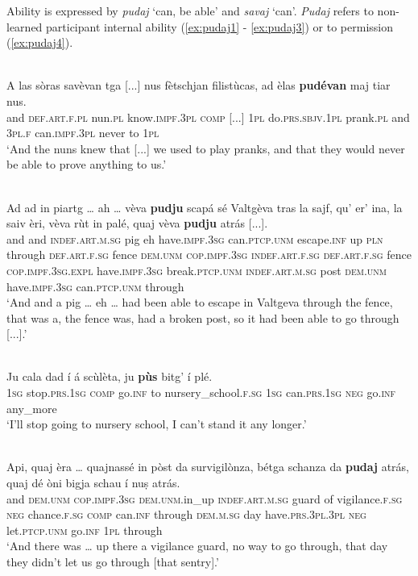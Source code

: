 Ability is expressed by \textit{pudaj} `can, be able' and \textit{savaj} `can'. \textit{Pudaj} refers to non-learned participant internal ability (\ref{ex:pudaj1} - \ref{ex:pudaj3}) or to permission (\ref{ex:pudaj4}).

\ea
\label{ex:pudaj1}
\\
\gll    A las sòras savèvan tga [...] nus fètschjan filistùcas, ad èlas \textbf{pudévan} maj tiar nus.\\
and \textsc{def.art.f.pl} nun.\textsc{pl} know.\textsc{impf.3pl} \textsc{comp} [...] \textsc{1pl} do.\textsc{prs.sbjv.1pl} prank.\textsc{pl} and \textsc{3pl.f} can.\textsc{impf.3pl} never to \textsc{1pl}\\
\glt `And the nuns knew that [...] we used to play pranks, and that they would never be able to prove anything to us.'
\z

\ea
\label{ex:pudaj2}
\\
\gll    Ad ad in piartg … ah … vèva \textbf{pudju} scapá sé Valtgèva tras la sajf, qu’ er’ ina, la saiv èri, vèva rùt in palé, quaj vèva \textbf{pudju} atrás [...].\\
and and \textsc{indef.art.m.sg} pig {} eh {}  have.\textsc{impf.3sg} can.\textsc{ptcp.unm} escape.\textsc{inf} up \textsc{pln} through \textsc{def.art.f.sg} fence  \textsc{dem.unm} \textsc{cop.impf.3sg}  \textsc{indef.art.f.sg} \textsc{def.art.f.sg} fence \textsc{cop.impf.3sg.expl} have.\textsc{impf.3sg} break.\textsc{ptcp.unm}  \textsc{indef.art.m.sg} post \textsc{dem.unm}  have.\textsc{impf.3sg} can.\textsc{ptcp.unm} through \\
\glt `And and a pig … eh … had been able to escape in Valtgeva through the fence, that was a, the fence was, had a broken post, so it had been able to go through [...].'
\z

\ea
\label{ex:pudaj3}
\\
\gll  Ju cala dad í á scùlèta, ju \textbf{pùs} bitg' í plé.\\
\textsc{1sg} stop.\textsc{prs.1sg} \textsc{comp} go.\textsc{inf} to nursery\_school.\textsc{f.sg} \textsc{1sg} can.\textsc{prs.1sg} \textsc{neg} go.\textsc{inf} any\_more  \\
\glt `I’ll stop going to nursery school, I can’t stand it any longer.'
\z

\ea
\label{ex:pudaj4}
\\
\gll  Api, quaj èra … quajnassé in pòst da survigilònza, bétga schanza da \textbf{pudaj} atrás, quaj dé òni bigja schau í nuṣ atrás.\\
and \textsc{dem.unm} \textsc{cop.impf.3sg} {} \textsc{dem.unm}.in\_up \textsc{indef.art.m.sg} guard of vigilance.\textsc{f.sg} \textsc{neg} chance.\textsc{f.sg} \textsc{comp} can.\textsc{inf} through \textsc{dem.m.sg} day have.\textsc{prs.3pl.3pl} \textsc{neg} let.\textsc{ptcp.unm} go.\textsc{inf} \textsc{1pl} through\\
\glt `And there was … up there a vigilance guard, no way to go through, that day they didn’t let us go through [that sentry].'
\z


